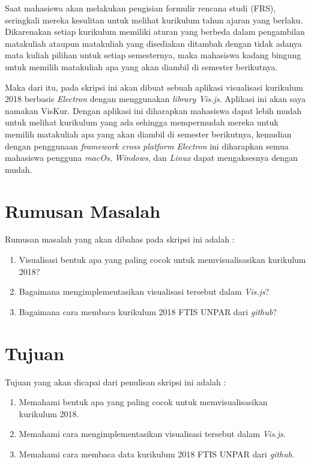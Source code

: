 Saat mahasiswa akan melakukan pengisian formulir rencana studi (FRS), seringkali mereka kesulitan untuk melihat kurikulum tahun ajaran yang berlaku. Dikarenakan setiap kurikulum memiliki aturan yang berbeda dalam pengambilan matakuliah ataupun matakuliah yang disediakan ditambah dengan tidak adanya mata kuliah pilihan untuk setiap semesternya, maka mahasiswa kadang bingung untuk memilih matakuliah apa yang akan diambil di semester berikutnya.

Maka dari itu, pada skripsi ini akan dibuat sebuah aplikasi visualisasi kurikulum 2018 berbasis \textit{Electron} dengan menggunakan \textit{library Vis.js}. Aplikasi ini akan saya namakan VisKur. Dengan aplikasi ini diharapkan mahasiswa dapat lebih mudah untuk melihat kurikulum yang ada sehingga mempermudah mereka untuk memilih matakuliah apa yang akan diambil di semester berikutnya, kemudian dengan penggunaan \textit{framework cross platform Electron} ini diharapkan semua mahasiswa pengguna \textit{macOs}, \textit{Windows}, dan \textit{Linux} dapat mengaksesnya dengan mudah.

\newpage
\section{Rumusan Masalah}
\label{sec:rumusan}
Rumusan masalah yang akan dibahas pada skripsi ini adalah :

\begin{enumerate}
    \item Visualisasi bentuk apa yang paling cocok untuk memvisualisasikan kurikulum 2018?
    \item Bagaimana mengimplementasikan visualisasi tersebut dalam \textit{Vis.js}?
    \item Bagaimana cara membaca kurikulum 2018 FTIS UNPAR dari \textit{github}?
\end{enumerate}

\section{Tujuan}
\label{sec:tujuan}

Tujuan yang akan dicapai dari penulisan skripsi ini adalah : 
\begin{enumerate}
    \item Memahami bentuk apa yang paling cocok untuk memvisualisasikan kurikulum 2018.
    \item Memahami cara mengimplementasikan visualisasi tersebut dalam \textit{Vis.js}.
    \item Memahami cara membaca data kurikulum 2018 FTIS UNPAR dari \textit{github}.
\end{enumerate}


